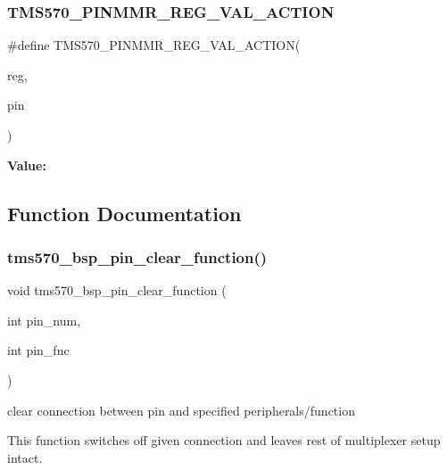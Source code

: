 \subsubsection{\texorpdfstring{TMS570\_PINMMR\_REG\_VAL\_ACTION}{TMS570\_PINMMR\_REG\_VAL\_ACTION}}
{\footnotesize\ttfamily \#define T\+M\+S570\+\_\+\+P\+I\+N\+M\+M\+R\+\_\+\+R\+E\+G\+\_\+\+V\+A\+L\+\_\+\+A\+C\+T\+I\+ON(\begin{DoxyParamCaption}\item[{}]{reg,  }\item[{}]{pin }\end{DoxyParamCaption})}

{\bfseries Value\+:}
\begin{DoxyCode}{0}

\end{DoxyCode}


\subsection{Function Documentation}
\mbox{\label{tms570-pinmux_8h_ac225c1f6113c3a39dfe69324b07fa625}} 
\subsubsection{\texorpdfstring{tms570\_bsp\_pin\_clear\_function()}{tms570\_bsp\_pin\_clear\_function()}}
{\footnotesize\ttfamily void tms570\+\_\+bsp\+\_\+pin\+\_\+clear\+\_\+function (\begin{DoxyParamCaption}\item[{int}]{pin\+\_\+num,  }\item[{int}]{pin\+\_\+fnc }\end{DoxyParamCaption})}



clear connection between pin and specified peripherals/function 

This function switches off given connection and leaves rest of multiplexer setup intact.


